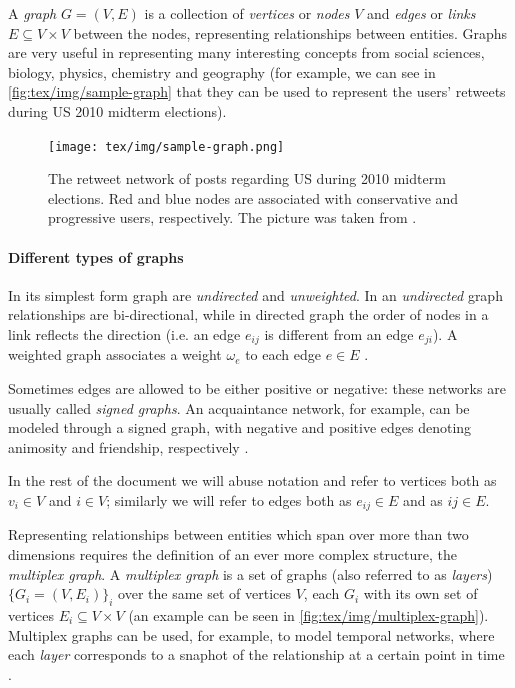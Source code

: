 A \emph{graph} $G = (V, E)$ is a collection of \emph{vertices} or \emph{nodes} $V$ and
\emph{edges} or \emph{links} $E \subseteq V \times V$ between the nodes, representing relationships
between entities. Graphs are very useful in
representing many interesting concepts from social sciences, biology, physics,
chemistry and geography (for example, we can see in
\autoref{fig:tex/img/sample-graph} that they
can be used to represent the users' retweets during US 2010 midterm elections)\cite{Newman2018}\cite{Menczer2020}.

\begin{figure}
	\centering
	\texttt{[image: tex/img/sample-graph.png]}
	\caption[Retweet network during 2010 midterm elections]{The retweet network of posts regarding US during 2010 midterm
		elections. Red and blue nodes are associated with conservative and
		progressive users, respectively. The picture was taken from
		\cite{Menczer2020}.}
	\label{fig:tex/img/sample-graph}
\end{figure}

\paragraph{Different types of graphs}%
\label{par:different_types_of_graphs}

In its simplest form graph are \emph{undirected} and \emph{unweighted}. In an
\emph{undirected} graph relationships are bi-directional, while in directed graph
the order of nodes in a link reflects the
direction (i.e. an edge $e_{ij} $ is different from an edge $e_{ji} $). A weighted
graph associates a weight $\omega _e$ to each edge $e \in E$
\cite{Menczer2020}\cite{AlbertLaszloNortheasternUniversity2016}.

Sometimes edges are allowed to be either positive or negative: these networks
are usually called \emph{signed graphs}. An acquaintance
network, for example, can be modeled through a signed graph, with negative and
positive edges denoting animosity and friendship, respectively \cite{Newman2018}.

\bigskip

In the rest of the document we will abuse notation and refer to vertices both
as $v_{i} \in V $ and $i \in V$; similarly we will refer to edges both as
$e_{ij} \in E $ and as $ij \in E$.

\bigskip

Representing relationships between entities which span over more than two
dimensions requires the definition of an ever more complex structure, the
\emph{multiplex graph}. A \emph{multiplex graph} is a set of graphs (also
referred to as \emph{layers}) $\{ G_i = (V, E_i)\} _i$ over the same set of
vertices $V$, each $G_i$ with its own set of vertices $E_i \subseteq V \times V $ (an
example can be seen in \autoref{fig:tex/img/multiplex-graph}). Multiplex graphs
can be used, for example, to model temporal networks, where
each \emph{layer} corresponds to a snaphot of the relationship at a certain
point in time \cite{Newman2018}.

